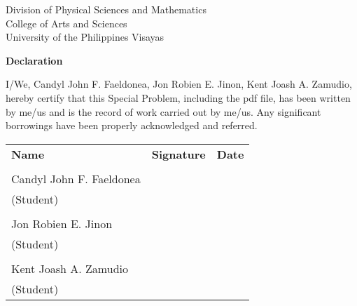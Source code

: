 \begin{center}
	Division of Physical Sciences and Mathematics\\
	College of Arts and Sciences\\
	University of the Philippines Visayas 
	
		\textbf{Declaration}
		\end{center}

I/We,  Candyl John F. Faeldonea, Jon Robien E. Jinon, Kent Joash A. Zamudio, hereby certify that this Special Problem, including the pdf file, has been written by me/us  and is the record of work carried out by me/us. Any significant borrowings have been properly acknowledged and referred.

	\begin{tabular}{lll}
	\bfseries Name  & \bfseries Signature & \bfseries Date\\ \\
	Candyl John F. Faeldonea &\signaturerule  & \signaturerule\\ 
	(Student)\\ \\
	Jon Robien E. Jinon &\signaturerule &\signaturerule\\
	(Student)\\ \\
	Kent Joash A. Zamudio &\signaturerule &\signaturerule\\
	(Student)
\end{tabular}



